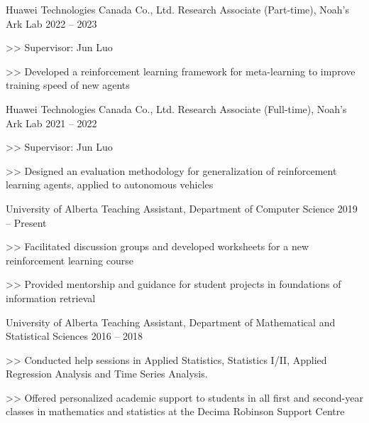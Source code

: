 \begin{cventries}
  \cventry
    {Huawei Technologies Canada Co., Ltd.}
    {Research Associate (Part-time), Noah's Ark Lab}
    {2022 -- 2023}
    {
      \begin{cvitems}
        \item[>>] Supervisor: Jun Luo
        \item[>>] Developed a reinforcement learning framework for meta-learning to improve training speed of new agents
      \end{cvitems}
    }

  \cventry
    {Huawei Technologies Canada Co., Ltd.}
    {Research Associate (Full-time), Noah's Ark Lab}
    {2021 -- 2022}
    {
      \begin{cvitems}
        \item[>>] Supervisor: Jun Luo
        \item[>>] Designed an evaluation methodology for generalization of reinforcement learning agents, applied to autonomous vehicles
      \end{cvitems}
    }

  \cventry
    {University of Alberta}
    {Teaching Assistant, Department of Computer Science}
    {2019 -- Present}
    {
      \begin{cvitems}
        \item[>>] Facilitated discussion groups and developed worksheets for a new reinforcement learning course
        \item[>>] Provided mentorship and guidance for student projects in foundations of information retrieval
      \end{cvitems}
    }


  \cventry
    {University of Alberta}
    {Teaching Assistant, Department of Mathematical and Statistical Sciences} {2016 -- 2018}
    {
      \begin{cvitems}
        \item[>>] Conducted help sessions in Applied Statistics, Statistics I/II, Applied Regression Analysis and Time Series Analysis.
        \item[>>] Offered personalized academic support to students in all first and second-year classes in mathematics and statistics at the Decima Robinson Support Centre
      \end{cvitems}
    }


\end{cventries}
